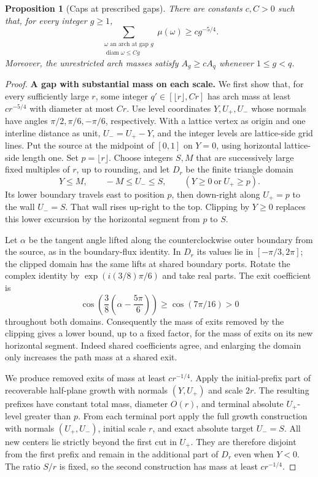 \documentclass[11pt]{article}
\numberwithin{equation}{section}
\newtheorem*{unnumberedproposition}{Proposition}
\theoremstyle{definition}\newtheorem{definition}[theorem]{Definition}
\theoremstyle{remark}\newtheorem{remark}[theorem]{Remark}
\begin{document}
\begin{unnumberedproposition}[Caps at prescribed gaps]
\label{L:prop:caps}
There are constants $c,C>0$ such that, for every integer $g\ge1$,
\[
 \sum_{\substack{\omega\text{ an arch at gap }g\\
                  \operatorname{diam}\omega\le Cg}}
       \mu(\omega)\ge c g^{-5/4}.
\]
Moreover, the unrestricted arch masses satisfy
$A_g\ge c A_q$ whenever $1\le g<q$.
\end{unnumberedproposition}
\begin{proof}
\medskip\noindent\textbf{A gap with substantial mass on each scale.}
We first show that, for every sufficiently large $r$, some integer
$q'\in[\lfloor r\rfloor,Cr]$ has arch mass at least $cr^{-5/4}$
with diameter at most $Cr$.
Use level coordinates $Y,U_+,U_-$ whose normals have angles
$\pi/2,\pi/6,-\pi/6$, respectively.  With a lattice vertex as origin
and one interline distance as unit, $U_-=U_+-Y$, and the integer levels
are lattice-side grid lines.  Put the source at the midpoint of
$[0,1]$ on $Y=0$, using horizontal lattice-side length one.  Set
$p=\lfloor r\rfloor$.  Choose integers $S,M$ that are successively
large fixed multiples of $r$, up to rounding, and let $D_r$ be the
finite triangle domain
\[
 Y\le M,\qquad -M\le U_-\le S,\qquad
 (Y\ge0\ \text{or}\ U_+\ge p).
\]
Its lower boundary travels east to position $p$, then down-right
along $U_+=p$ to the wall $U_-=S$.  That wall rises up-right to the
top.  Clipping by $Y\ge0$ replaces this lower excursion by the
horizontal segment from $p$ to $S$.

Let $\alpha$ be the tangent angle lifted along the counterclockwise
outer boundary from the source, as in the boundary-flux identity.
In $D_r$ its values lie in $[-\pi/3,2\pi]$; the clipped domain has
the same lifts at shared boundary ports.  Rotate the complex identity
by $\exp(i(3/8)\pi/6)$ and take real parts.  The exit coefficient is
\[
 \cos\!\left(\frac38\left(\alpha-\frac{5\pi}{6}\right)\right)
 \ge\cos(7\pi/16)>0
\]
throughout both domains.  Consequently the mass of exits removed by
the clipping gives a lower bound, up to a fixed factor, for the mass
of exits on its new horizontal segment.  Indeed shared coefficients
agree, and enlarging the domain only increases the path mass at a
shared exit.

We produce removed exits of mass at least $cr^{-1/4}$.  Apply the
initial-prefix part of recoverable half-plane growth with normals
$(Y,U_+)$ and scale $2r$.  The resulting prefixes have constant total
mass, diameter $O(r)$, and terminal absolute $U_+$-level greater
than $p$.  From each terminal port apply the full growth construction
with normals $(U_+,U_-)$, initial scale $r$, and exact absolute target
$U_-=S$.  All new centers lie strictly beyond the first cut in $U_+$.
They are therefore disjoint from the first prefix and remain in the
additional part of $D_r$ even when $Y<0$.  The ratio $S/r$ is fixed,
so the second construction has mass at least $cr^{-1/4}$.


\end{proof}
\end{document}
